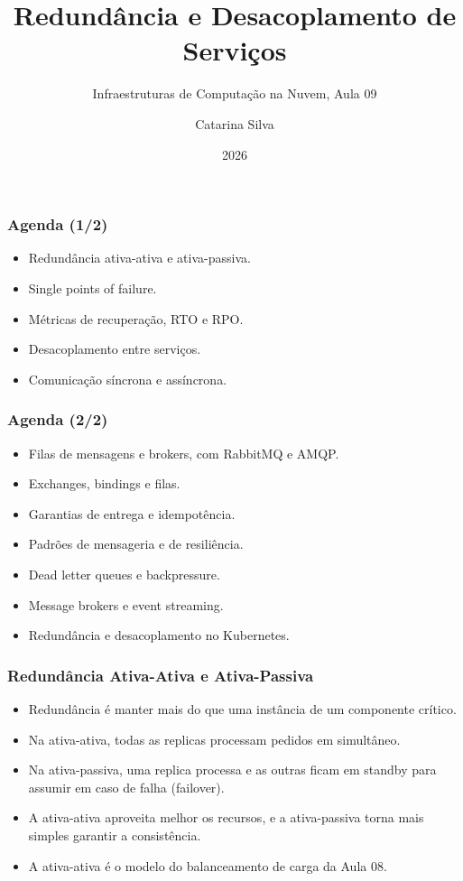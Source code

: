 \documentclass[aspectratio=169]{beamer}
\title{Redundância e Desacoplamento de Serviços}
\subtitle{Infraestruturas de Computação na Nuvem, Aula 09}
\author{Catarina Silva}
\institute{ESTGA, Universidade de Aveiro}
\date{2026}
\begin{document}
\begin{frame}[plain]
  \titlepage
\end{frame}

\begin{frame}
\frametitle{Agenda \textcolor{NudeTaupe}{\small(1/2)}}
\begin{itemize}
    \setlength\itemsep{0.4cm}
    \item Redundância ativa-ativa e ativa-passiva.
    \item Single points of failure.
    \item Métricas de recuperação, RTO e RPO.
    \item Desacoplamento entre serviços.
    \item Comunicação síncrona e assíncrona.
\end{itemize}
\end{frame}

\begin{frame}
\frametitle{Agenda \textcolor{NudeTaupe}{\small(2/2)}}
\begin{itemize}
    \setlength\itemsep{0.4cm}
    \item Filas de mensagens e brokers, com RabbitMQ e AMQP.
    \item Exchanges, bindings e filas.
    \item Garantias de entrega e idempotência.
    \item Padrões de mensageria e de resiliência.
    \item Dead letter queues e backpressure.
    \item Message brokers e event streaming.
    \item Redundância e desacoplamento no Kubernetes.
\end{itemize}
\end{frame}

\begin{frame}
\frametitle{Redundância Ativa-Ativa e Ativa-Passiva}
\begin{itemize}
    \setlength\itemsep{0.4cm}
    \item Redundância é manter mais do que uma instância de um componente crítico.
    \item Na ativa-ativa, todas as replicas processam pedidos em simultâneo.
    \item Na ativa-passiva, uma replica processa e as outras ficam em standby para assumir em caso de falha (failover).
    \item A ativa-ativa aproveita melhor os recursos, e a ativa-passiva torna mais simples garantir a consistência.
    \item A ativa-ativa é o modelo do balanceamento de carga da Aula 08.
\end{itemize}
\end{frame}
\end{document}
